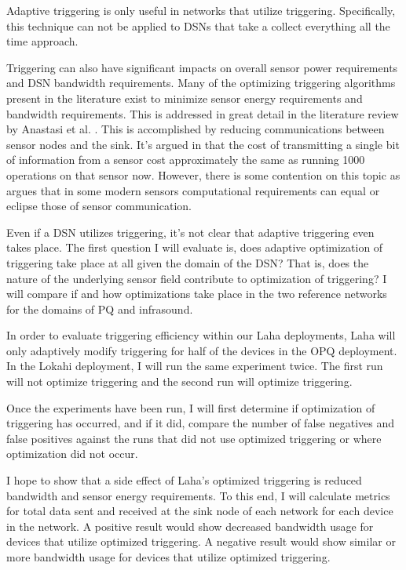 Adaptive triggering is only useful in networks that utilize triggering. Specifically, this technique can not be applied to DSNs that take a collect everything all the time approach.

Triggering can also have significant impacts on overall sensor power requirements and DSN bandwidth requirements. Many of the optimizing triggering algorithms present in the literature exist to minimize sensor energy requirements and bandwidth requirements. This is addressed in great detail in the literature review by Anastasi et al. \cite{anastasi_energy_2009}. This is accomplished by reducing communications between sensor nodes and the sink. It's argued in \cite{pottie2000wireless} that the cost of transmitting a single bit of information from a sensor cost approximately the same as running 1000 operations on that sensor now. However, there is some contention on this topic as \cite{alippi_adaptive_2010} argues that in some modern sensors computational requirements can equal or eclipse those of  sensor communication.  

Even if a DSN utilizes triggering, it's not clear that adaptive triggering even takes place. The first question I will evaluate is, does adaptive optimization of triggering take place at all given the domain of the DSN? That is, does the nature of the underlying sensor field contribute to optimization of triggering? I will compare if and how optimizations take place in the two reference networks for the domains of PQ and infrasound.

In order to evaluate triggering efficiency within our Laha deployments, Laha will only adaptively modify triggering for half of the devices in the OPQ deployment. In the Lokahi deployment, I will run the same experiment twice. The first run will not optimize triggering and the second run will optimize triggering.

Once the experiments have been run, I will first determine if optimization of triggering has occurred, and if it did, compare the number of false negatives and false positives against the runs that did not use optimized triggering or where optimization did not occur. 

I hope to show that a side effect of Laha's optimized triggering is reduced bandwidth and sensor energy requirements. To this end, I will calculate metrics for total data sent and received at the sink node of each network for each device in the network. A positive result would show decreased bandwidth usage for devices that utilize optimized triggering. A negative result would show similar or more bandwidth usage for devices that utilize optimized triggering.

